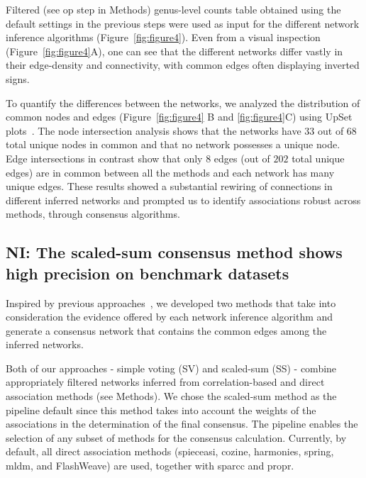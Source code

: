 \documentclass[letterpaper,12pt]{article}
\begin{document}
  Filtered (see \ac{op} step in Methods) genus-level counts table obtained using the default settings in the previous steps were used as input for the different network inference algorithms (Figure~\ref{fig:figure4}).
  Even from a visual inspection (Figure~\ref{fig:figure4}A), one can see that the different networks differ vastly in their edge-density and connectivity, with common edges often displaying inverted signs.

  To quantify the differences between the networks, we analyzed the distribution of common nodes and edges (Figure~\ref{fig:figure4} B and \ref{fig:figure4}C) using UpSet plots~\cite{lexUpSetVisualizationIntersecting2014}.
  The node intersection analysis shows that the networks have $33$ out of $68$ total unique nodes in common and that no network possesses a unique node.
  Edge intersections in contrast show that only $8$ edges (out of $202$ total unique edges) are in common between all the methods and each network has many unique edges.
  These results showed a substantial rewiring of connections in different inferred networks and prompted us to identify associations robust across methods, through consensus algorithms.

  \FloatBarrier

  \subsection*{NI: The scaled-sum consensus method shows high precision on benchmark datasets}

 Inspired by previous approaches~\cite{bustinceFuzzySetsTheir2008,tsarevApplicationMajorityVoting2018}, we developed two methods that take into consideration the evidence offered by each network inference algorithm and generate a consensus network that contains the common edges among the inferred networks.

  Both of our approaches - simple voting (SV) and scaled-sum (SS) - combine appropriately filtered networks inferred from correlation-based and direct association methods (see Methods).
  We chose the scaled-sum method as the pipeline default since this method takes into account the weights of the associations in the determination of the final consensus.
  The pipeline enables the selection of any subset of methods for the consensus calculation. Currently, by default, all direct association methods (\acs{spieceasi}, \acs{cozine}, \acs{harmonies}, \acs{spring}, \acs{mldm}, and FlashWeave) are used, together with \acs{sparcc} and propr.
\end{document}
